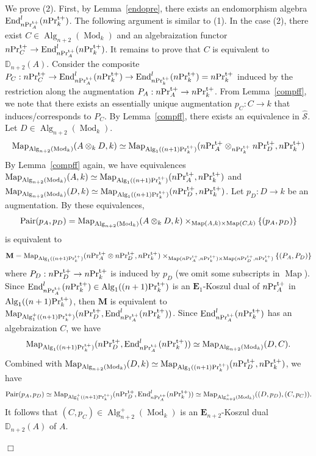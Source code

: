 \documentclass[leqno,12pt]{amsart}
\theoremstyle{plain}
\theoremstyle{definition}
\newcommand{\DD}{\mathbb{D}}
\newcommand{\PRTT}{\textup{Pr}^{\textup{t}+}}
\newcommand{\Mod}{\operatorname{Mod}}
\newcommand{\wSSS}{\widehat{\mathcal{S}}}
\newcommand{\Map}{\operatorname{Map}}
\newcommand{\Alg}{\operatorname{Alg}}
\newcommand{\End}{\operatorname{End}}
\newcommand{\eone}{\mathbf{E}_1}
\newcommand{\QED}{{\unskip\nobreak\hfil\penalty50\quad\null\nobreak\hfil
{$\Box$}\parfillskip0pt\finalhyphendemerits0\par\medskip}}
\begin{document}
We prove (2). First, by Lemma~\ref{endopre}, there exists an endomorphism algebra $\End_{n\PRTT_A}^l(n\PRTT_k)$.
The following argument is similar to (1).
In the case (2), there exist $C\in \Alg_{n+2}(\Mod_k)$ and an algebraization functor $n\PRTT_C\to \End_{n\PRTT_A}^l(n\PRTT_k)$.
It remains to prove that $C$ is equivalent to $\DD_{n+2}(A)$.
Consider the composite $P_C:n\PRTT_C\to \End_{n\PRTT_A}^l(n\PRTT_k)\to\End_{n\PRTT_k}^l(n\PRTT_k)=n\PRTT_k$ induced by the restriction along the augmentation $P_A:n\PRTT_A\to n\PRTT_k$.
From Lemma~\ref{compff}, we note that there exists an essentially unique augmentation $p_C:C\to k$ that induces/corresponds to $P_C$. 
By Lemma~\ref{compff}, there exists an equivalence in $\wSSS$.
Let $D\in \Alg_{n+2}(\Mod_k)$.
\begin{eqnarray*}
\Map_{\Alg_{n+2}(\Mod_k)}(A\otimes_k D,k) \simeq \Map_{\Alg_1((n+1)\PRTT_k)}(n\PRTT_A\otimes_{n\PRTT_k}n\PRTT_D,n\PRTT_k)
\end{eqnarray*}
By Lemma~\ref{compff} again, we have equivalences
$\Map_{\Alg_{n+2}(\Mod_k)}(A,k)\simeq \Map_{\Alg_1((n+1)\PRTT_k)}(n\PRTT_A,n\PRTT_k)$ and $\Map_{\Alg_{n+2}(\Mod_k)}(D,k)\simeq \Map_{\Alg_1((n+1)\PRTT_k)}(n\PRTT_D,n\PRTT_k)$.
Let $p_D:D\to k$ be an augmentation.
By these equivalences, 
\begin{eqnarray*}
\textup{Pair}(p_A,p_D)=\Map_{\Alg_{n+2}(\Mod_k)}(A\otimes_k D,k)\times_{\Map(A,k)\times \Map(C,k)}\{(p_A,p_D)\}
\end{eqnarray*}
is equivalent to
\[
\mathbf{M}=\Map_{\Alg_1((n+1)\PRTT_k)}(n\PRTT_A\otimes n\PRTT_D,n\PRTT_k)\times_{ \Map(n\PRTT_A,n\PRTT_k)\times \Map(n\PRTT_D,n\PRTT_k)}\{(P_A,P_D)\}
\]
where $P_D:n\PRTT_D\to n\PRTT_k$ is induced by $p_D$ 
(we omit some subscripts in $\Map$). Since  $\End_{n\PRTT_A}^l(n\PRTT_k)\in \Alg_1((n+1)\PRTT_k)$ is an $\eone$-Koszul dual of $n\PRTT_A$ in $\Alg_1((n+1)\PRTT_k)$,
then $\mathbf{M}$
is equivalent to $\Map_{\Alg_1^+((n+1)\PRTT_k)}(n\PRTT_D, \End_{n\PRTT_A}^l(n\PRTT_k))$.
Since $\End_{n\PRTT_A}^l(n\PRTT_k)$ has an algebraization $C$, 
we have
\[
\Map_{\Alg_1((n+1)\PRTT_k)}(n\PRTT_D, \End_{n\PRTT_A}^l(n\PRTT_k))\simeq \Map_{\Alg_{n+2}(\Mod_k)}(D,C).
\]
Combined with  $\Map_{\Alg_{n+2}(\Mod_k)}(D,k)\simeq \Map_{\Alg_1((n+1)\PRTT_k)}(n\PRTT_D,n\PRTT_k)$,
we have
\[
\textup{Pair}(p_A,p_D)\simeq \Map_{\Alg_1^+((n+1)\PRTT_k)}(n\PRTT_D, \End_{n\PRTT_A}^l(n\PRTT_k))\simeq \Map_{\Alg^+_{n+2}(\Mod_k)}((D,p_D),(C,p_C)).
\]
It follows that $(C,p_C)\in \Alg_{n+2}^+(\Mod_k)$ is an $\mathbf{E}_{n+2}$-Koszul dual $\DD_{n+2}(A)$ of $A$.
\QED
\end{document}
